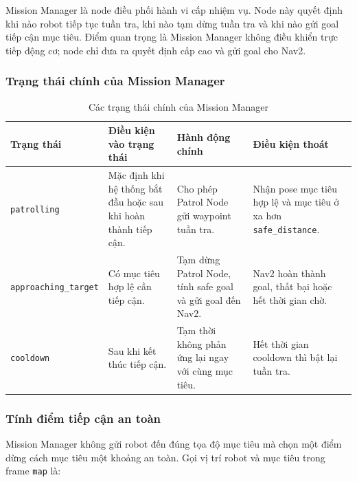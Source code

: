 Mission Manager là node điều phối hành vi cấp nhiệm vụ. Node này quyết định khi nào robot tiếp tục tuần tra, khi nào tạm dừng tuần tra và khi nào gửi goal tiếp cận mục tiêu. Điểm quan trọng là Mission Manager không điều khiển trực tiếp động cơ; node chỉ đưa ra quyết định cấp cao và gửi goal cho Nav2.

\subsubsection{Trạng thái chính của Mission Manager}
\label{subsubsec:mission-manager-states}

\begin{table}[H]
    \centering
    \caption{Các trạng thái chính của Mission Manager}
    \label{tab:mission-manager-states}
    \renewcommand{\arraystretch}{1.25}
    \small
    \begin{tabularx}{\textwidth}{|>{\raggedright\arraybackslash}p{}|>{\raggedright\arraybackslash}p{}|>{\raggedright\arraybackslash}p{}|>{\raggedright\arraybackslash}X|}
        \hline
        \textbf{Trạng thái} & \textbf{Điều kiện vào trạng thái} & \textbf{Hành động chính} & \textbf{Điều kiện thoát} \\
        \hline
        \texttt{patrolling} & Mặc định khi hệ thống bắt đầu hoặc sau khi hoàn thành tiếp cận. & Cho phép Patrol Node gửi waypoint tuần tra. & Nhận pose mục tiêu hợp lệ và mục tiêu ở xa hơn \texttt{safe\_}\newline\texttt{distance}. \\
        \hline
        \texttt{approaching\_}\newline\texttt{target} & Có mục tiêu hợp lệ cần tiếp cận. & Tạm dừng Patrol Node, tính safe goal và gửi goal đến Nav2. & Nav2 hoàn thành goal, thất bại hoặc hết thời gian chờ. \\
        \hline
        \texttt{cooldown} & Sau khi kết thúc tiếp cận. & Tạm thời không phản ứng lại ngay với cùng mục tiêu. & Hết thời gian cooldown thì bật lại tuần tra. \\
        \hline
    \end{tabularx}
\end{table}

\subsubsection{Tính điểm tiếp cận an toàn}
\label{subsubsec:safe-goal-calculation}

Mission Manager không gửi robot đến đúng tọa độ mục tiêu mà chọn một điểm dừng cách mục tiêu một khoảng an toàn. Gọi vị trí robot và mục tiêu trong frame \texttt{map} là:

